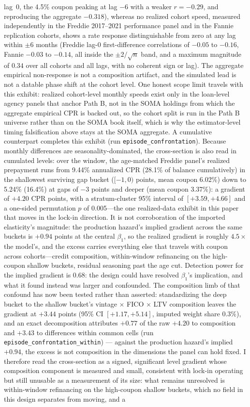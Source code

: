 \documentclass[12pt]{article}
\begin{document}
lag~0, the 4.5\% coupon peaking at lag $-6$ with a weaker $r=-0.29$, and reproducing the aggregate $-0.318$), whereas no realized cohort speed, measured independently in the Freddie 2017--2021 performance panel and in the Fannie replication cohorts, shows a rate response distinguishable from zero at any lag within $\pm 6$ months (Freddie lag-0 first-difference correlations of $-0.05$ to $-0.16$, Fannie $-0.03$ to $-0.14$, all inside the $\pm 2/\sqrt{n}$ band, and a maximum magnitude of $0.34$ over all cohorts and all lags, with no coherent sign or lag). The aggregate empirical non-response is not a composition artifact, and the simulated lead is not a datable phase shift at the cohort level. One honest scope limit travels with this exhibit: realized cohort-level monthly speeds exist only in the loan-level agency panels that anchor Path B, not in the SOMA holdings from which the aggregate empirical CPR is backed out, so the cohort split is run in the Path B universe rather than on the SOMA book itself, which is why the estimator-level timing falsification above stays at the SOMA aggregate. A cumulative counterpart completes this exhibit (run \texttt{episode\_confrontation}). Because monthly differences are seasonality-dominated, the cross-section is also read in cumulated levels: over the window, the age-matched Freddie panel's realized prepayment runs from 9.44\% annualized CPR (28.1\% of balance cumulatively) in the shallowest surviving gap bucket ($[-1,0)$ points, mean coupon 6.02\%) down to 5.24\% (16.4\%) at gaps of $-3$ points and deeper (mean coupon 3.37\%): a gradient of $+4.20$ CPR points, with a stratum-cluster 95\% interval of $[+3.59, +4.66]$ and a one-sided permutation $p$ of 0.005---the one realized-data exhibit in this paper that moves in the lock-in direction. It is not corroboration of the imported elasticity's magnitude: the production hazard's implied gradient across the same buckets is $+0.94$ points at the central $\beta_1$, so the realized gradient is roughly $4.5\times$ the model's, and the excess carries everything else that travels with coupon across cohorts---credit composition, within-window refinancing on the high-coupon shallow buckets, residual seasoning past the age cut. Detection power for the implied gradient is 0.68: the design could have resolved $\beta_1$'s implication, and what it found instead was larger and confounded. The composition limb of that confound has now been tested rather than asserted: standardizing the deep bucket to the shallow bucket's vintage $\times$ FICO $\times$ LTV composition leaves the gradient at $+3.44$ points (95\% CI $[+1.17, +5.14]$, imputed weight share $0.3\%$), and an exact decomposition attributes $+0.77$ of the raw $+4.20$ to composition and $+3.43$ to differences within common cells (run \texttt{episode\_confrontation\_within}) --- against the production hazard's implied $+0.94$, the excess is not composition in the dimensions the panel can hold fixed. I therefore read the cross-section as a signed, significant level gradient whose composition component is measured and small, consistent with lock-in operating but still unusable as a measurement of its size: what remains unresolved is within-window refinancing on the high-coupon shallow buckets, which no field in this design separates from moving, and a 
\end{document}
